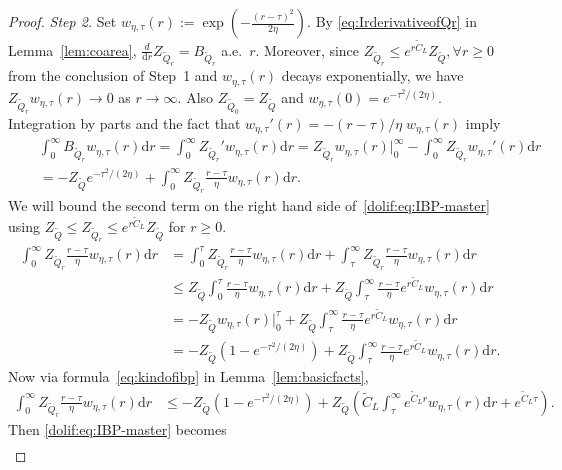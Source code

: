 \documentclass[11pt,letterpaper]{article}
\newcommand{\Q}{\widetilde{Q}}
\newcommand{\D}{\mathrm{d}}
\newcommand{\brac}[1]{\left( #1\right)}
\begin{document}
\begin{proof}
\emph{Step 2.}
Set $w_{\eta,\tau}(r):=\exp \left(-\frac{(r-\tau)^2}{2\eta}\right)$.
By \eqref{eq:IrderivativeofQr} in Lemma~\ref{lem:coarea},
$\frac{d}{\D r}Z_{\Q_r}=B_{\Q_r}$ a.e.\ $r$.
Moreover, since $Z_{\Q_r}\le e^{r\widetilde{C}_L}Z_{\Q},\forall r\ge0$ from the conclusion of Step~1 and $w_{\eta,\tau}(r)$ decays exponentially,
we have $Z_{\Q_r}w_{\eta,\tau}(r)\to0$ as $r\to\infty$.
Also $Z_{\Q_0}=Z_{\Q}$ and $w_{\eta,\tau}(0)=e^{-\tau^2/(2\eta)}$.
Integration by parts and the fact that  $w_{\eta,\tau}'(r)=-(r-\tau)/\eta\; w_{\eta,\tau}(r)$ imply
\begin{align}
\label{dolif:eq:IBP-master}
&\int_{0}^{\infty} B_{\Q_r}   w_{\eta,\tau}(r)  \D r
=\int_{0}^{\infty} Z_{\Q_r}'   w_{\eta,\tau}(r)  \D r
= Z_{\Q_r}w_{\eta,\tau}(r)\bigg|_{0}^{\infty}
-\int_{0}^{\infty} Z_{\Q_r}   w_{\eta,\tau}'(r)  \D r\nonumber\\
\quad&= -Z_{\Q} e^{-\tau^2/(2\eta)}
+ \int_{0}^{\infty} Z_{\Q_r}  \frac{r-\tau}{\eta}  w_{\eta,\tau}(r)  \D r.
\end{align}
We will bound the second term on the right hand side of~\eqref{dolif:eq:IBP-master} using $Z_{\Q}\leq Z_{\Q_r}\leq e^{r\widetilde{C}_L}Z_{\Q}$ for $r\geq 0$.  
\begin{align*}
    \int_{0}^{\infty} Z_{\Q_r}  \frac{r-\tau}{\eta}  w_{\eta,\tau}(r)  \D r &= \int_0^\tau Z_{\Q_r}  \frac{r-\tau}{\eta}  w_{\eta,\tau}(r)  \D r + \int_\tau^\infty Z_{\Q_r}  \frac{r-\tau}{\eta}  w_{\eta,\tau}(r)  \D r\\
    &\leq Z_{\Q}\int_0^\tau \frac{r-\tau}{\eta}    w_{\eta,\tau}(r)  \D r+ Z_{\Q}\int_\tau^\infty \frac{r-\tau}{\eta}  e^{r\widetilde{C}_L}  w_{\eta,\tau}(r)  \D r \\
    &= - Z_{\Q} w_{\eta,\tau}(r) \bigg|_{0}^{\tau} + Z_{\Q}\int_\tau^\infty \frac{r-\tau}{\eta}  e^{r\widetilde{C}_L}  w_{\eta,\tau}(r)  \D r \\
    &= - Z_{\Q} (1 - e^{-\tau^2/(2\eta)}) + Z_{\Q}\int_\tau^\infty \frac{r-\tau}{\eta}  e^{r\widetilde{C}_L}  w_{\eta,\tau}(r)  \D r.
\end{align*}
Now via formula~\eqref{eq:kindofibp} in Lemma~\ref{lem:basicfacts}, 
\begin{align*}
     \int_{0}^{\infty} Z_{\Q_r}  \frac{r-\tau}{\eta}  w_{\eta,\tau}(r)  \D r &\leq - Z_{\Q} (1 - e^{-\tau^2/(2\eta)}) +Z_{\Q}\brac{ \widetilde{C}_L\int_\tau^{\infty} e^{\widetilde{C}_Lr}w_{\eta,\tau}(r) \D r + e^{\widetilde{C}_L \tau} }. 
\end{align*}
Then \eqref{dolif:eq:IBP-master} becomes
\begin{align}

\end{align}
\end{proof}
\end{document}
